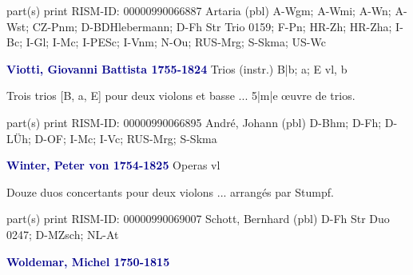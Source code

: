 \documentclass[twocolumn]{book}
\begin{document}
\newline \textcolor{darkblue}{}  part(s)  
\newline print
\newline RISM-ID: 00000990066887
\newline Artaria  (pbl)
\newline A-Wgm; A-Wmi; A-Wn; A-Wst; CZ-Pnm; D-BDHlebermann; D-Fh  Str Trio 0159; F-Pn; HR-Zh; HR-Zha; I-Bc; I-Gl; I-Mc; I-PESc; I-Vnm; N-Ou; RUS-Mrg; S-Skma; US-Wc
\newline \par \vspace{7pt} \textcolor{darkblue}{\textbf{Viotti, Giovanni Battista  1755-1824}}
\newline Trios (instr.)  B|b; a; E  
 vl, b
\newline \begin{itshape}Trois trios [B, a, E] pour deux violons et basse ... 5|m|e œuvre de trios.\end{itshape} 
\newline \textcolor{darkblue}{}  part(s)  
\newline print
\newline RISM-ID: 00000990066895
\newline André, Johann  (pbl)
\newline D-Bhm; D-Fh; D-LÜh; D-OF; I-Mc; I-Vc; RUS-Mrg; S-Skma
\newline \par \vspace{7pt} \textcolor{darkblue}{\textbf{Winter, Peter von  1754-1825}}
\newline Operas    
 vl
\newline \begin{itshape}Douze duos concertants pour deux violons ... arrangés par Stumpf.\end{itshape} 
\newline \textcolor{darkblue}{}  part(s)  
\newline print
\newline RISM-ID: 00000990069007
\newline Schott, Bernhard  (pbl)
\newline D-Fh  Str Duo 0247; D-MZsch; NL-At
\newline \par \vspace{7pt} \textcolor{darkblue}{\textbf{Woldemar, Michel  1750-1815}}
\end{document}
